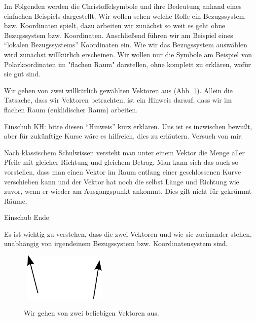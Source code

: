 \documentclass[11pt,a4paper]{article}
\begin{document}


Im Folgenden werden die Christoffelsymbole und ihre Bedeutung anhand eines einfachen Beispiels dargestellt. Wir wollen sehen welche Rolle ein Bezugssystem bzw.  Koordinaten spielt, dazu arbeiten wir zunächst so weit es geht ohne Bezugssystem bzw. Koordinaten. Anschließend führen wir am Beispiel eines "`lokalen Bezugssystems"' Koordinaten ein. Wie wir das Bezugssystem auswählen wird zunächst willkürlich erscheinen. Wir wollen nur die Symbole am Beispiel von Polarkoordinaten im "flachen Raum" darstellen, ohne komplett zu erklären, wofür sie gut sind.

Wir gehen von zwei willkürlich gewählten Vektoren aus (Abb. \ref{fig:Vektoren-ohne-alles}). Allein die Tatsache, dass wir Vektoren betrachten, ist ein Hinweis darauf, dass wir im flachen Raum (euklidischer Raum) arbeiten. 

\bigskip
Einschub KH: bitte diesen "`Hinweis"' kurz erklären. Uns ist es inzwischen bewußt, aber für zukünftige Kurse wäre es hilfreich, dies zu erläutern. Versuch von mir: 

Nach klassischem Schulwissen versteht man unter einem Vektor die Menge aller Pfeile mit gleicher Richtung und gleichem Betrag. Man kann sich das auch so vorstellen, dass man einen Vektor im Raum entlang einer geschlossenen Kurve verschieben kann und der Vektor hat noch die selbst Länge und Richtung wie zuvor, wenn er wieder am Ausgangspunkt ankommt. Dies gilt nicht für gekrümmt Räume. 

Einschub Ende
\bigskip

Es ist wichtig zu verstehen, dass die zwei Vektoren und wie sie zueinander stehen, unabhängig von irgendeinem Bezugssystem bzw. Koordinatensystem sind. 

\begin{figure}
  \centering
  \mbox{
    \includegraphics[width=4cm]{img/Christoffel-Zeichnung-1.png}
  }
    \captionsetup{singlelinecheck=off}
    \caption[.]{Wir gehen von zwei beliebigen Vektoren aus.
	}
    \label{fig:Vektoren-ohne-alles}
\end{figure}
\end{document}
